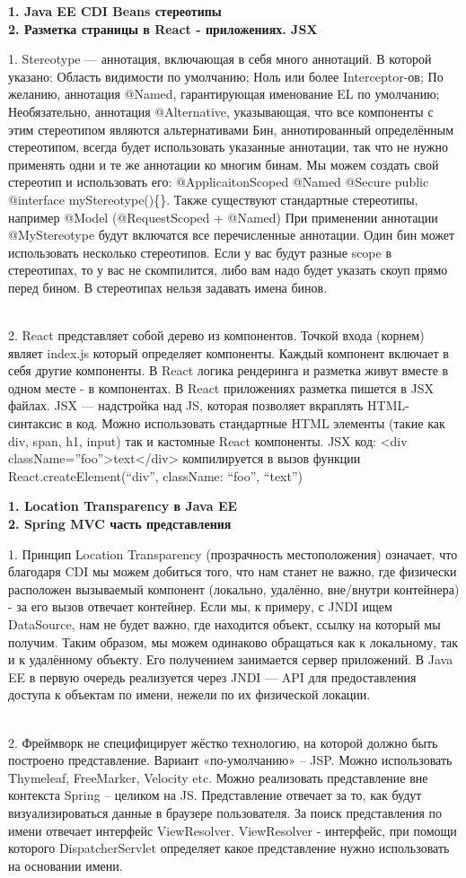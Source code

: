 \documentclass{article}
\newcommand{\bil}[4]{%
    \begin{minipage}{.3\textwidth}
        \textbf{1. #1} \\
        \textbf{2. #2}

        1. #3
        \\
        2. #4
    \end{minipage}
}
\begin{document}
\bil{Java EE CDI Beans стереотипы}{Разметка страницы в React - приложениях. JSX}{
    Stereotype — аннотация, включающая в себя много аннотаций.
    В которой указано: Область видимости по умолчанию; Ноль или более Interceptor-ов;
    По желанию, аннотация @Named, гарантирующая именование EL по умолчанию;
    Необязательно, аннотация @Alternative, указывающая, что все компоненты с этим стереотипом являются альтернативами
    Бин, аннотированный определённым стереотипом, всегда будет использовать указанные аннотации, так что не нужно применять одни и те же аннотации ко многим бинам. 
    Мы можем создать свой стереотип и использовать его:
    @ApplicaitonScoped @Named @Secure public @interface myStereotype()\{\}.
    Также существуют стандартные стереотипы, например @Model (@RequestScoped + @Named)
	При применении аннотации @MyStereotype будут включатся все перечисленные аннотации. Один бин может использовать несколько стереотипов.
    Если у вас будут разные scope в стереотипах, то у вас не скомпилится, либо вам надо будет указать скоуп прямо перед бином. В стереотипах нельзя задавать имена бинов.
}{
    React представляет собой дерево из компонентов. Точкой входа (корнем) являет index.js который определяет компоненты. Каждый компонент включает в себя другие компоненты.
    В React логика рендеринга и разметка живут вместе в одном месте - в компонентах.
    В React приложениях разметка пишется в JSX файлах. JSX — надстройка над JS, которая позволяет вкраплять HTML-синтаксис в код. Можно использовать стандартные HTML элементы (такие как div, span, h1, input) так и кастомные React компоненты.
    JSX код: <div className=”foo”>text</div> компилируется в вызов функции React.createElement(“div”, { className: “foo”}, “text”)
}
\hfill
\bil{Location Transparency в Java EE}{Spring MVC часть представления}{
    Принцип Location Transparency (прозрачность местоположения) означает, что благодаря CDI мы можем добиться того, что нам станет не важно, где физически расположен вызываемый компонент (локально, удалённо, вне/внутри контейнера) - за его вызов отвечает контейнер. 
    Если мы, к примеру, с JNDI ищем DataSource, нам не будет важно, где находится объект, ссылку на который мы получим. Таким образом, мы можем одинаково обращаться как к локальному, так и к удалённому объекту. Его получением занимается сервер приложений.
    В Java EE в первую очередь реализуется через JNDI — API для предоставления доступа к объектам по имени, нежели по их физической локации.
}{
    Фреймворк не специфицирует жёстко технологию, на которой должно быть построено представление.
    Вариант «по-умолчанию» – JSP.
    Можно использовать Thymeleaf, FreeMarker, Velocity etc.
    Можно реализовать представление вне контекста Spring – целиком на JS.  
    Представление отвечает за то, как будут визуализироваться данные в браузере пользователя.
    За поиск представления по имени отвечает интерфейс ViewResolver.
ViewResolver - интерфейс, при помощи которого DispatcherServlet определяет какое представление нужно использовать на основании имени.
}
\end{document}
